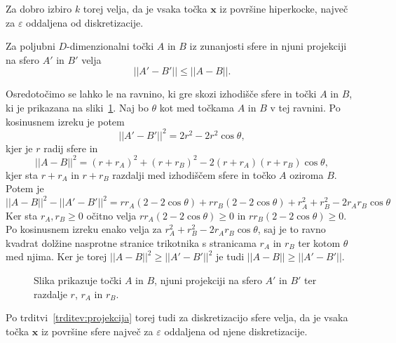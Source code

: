 Za dobro izbiro $k$ torej velja, da je vsaka točka $\textbf{x}$ iz površine hiperkocke, največ za $\varepsilon$ oddaljena od diskretizacije. 
\begin{trditev}
\label{trditev:projekcija}
Za poljubni $D$-dimenzionalni točki $A$ in $B$ iz zunanjosti sfere in njuni projekciji na sfero $A'$ in $B'$ velja
\[
|| A' - B' || \leq || A - B ||. 
\]
\end{trditev}
\begin{dokaz}
Osredotočimo se lahko le na ravnino, ki gre skozi izhodišče sfere in točki $A$ in $B$, ki je prikazana na sliki~\ref{fig:sphere_contraction}. Naj bo $\theta$ kot med točkama $A$ in $B$ v tej ravnini. Po kosinusnem izreku je potem 
\[
||A' - B'||^2 = 2r^2 - 2r^2 \cos \theta,
\]
kjer je $r$ radij sfere in
\[
||A - B||^2 = (r + r_A)^2 + (r + r_B)^2 - 2(r + r_A) (r + r_B) \cos \theta,
\]
kjer sta $r + r_A$ in $r + r_B$ razdalji med izhodiščem sfere in točko $A$ oziroma $B$. Potem je
\[
||A - B||^2 - ||A' - B'||^2 = rr_A (2 - 2 \cos \theta) + rr_B (2 - 2 \cos \theta) + r_A^2 + r_B^2 - 2 r_A r_B \cos \theta
\]
Ker sta $r_A, r_B \geq 0$ očitno velja $rr_A (2 - 2 \cos \theta) \geq 0$ in $rr_B (2 - 2 \cos \theta) \geq 0$. Po kosinusnem izreku enako velja za $r_A^2 + r_B^2 - 2 r_A r_B \cos \theta$, saj je to ravno kvadrat dolžine nasprotne stranice trikotnika s stranicama $r_A$ in $r_B$ ter kotom $\theta$ med njima. Ker je torej $||A - B||^2 \geq ||A' - B'||^2$ je tudi $||A - B|| \geq ||A' - B'||$.
\begin{figure}[ht]
  \centering
  
  \caption{Slika prikazuje točki $A$ in $B$, njuni projekciji na sfero $A'$ in $B'$ ter razdalje $r$, $r_A$ in $r_B$.}
  \label{fig:sphere_contraction}
\end{figure}
\end{dokaz}

Po trditvi~\ref{trditev:projekcija} torej tudi za diskretizacijo sfere velja, da je vsaka točka $\textbf{x}$ iz površine sfere največ za $\varepsilon$ oddaljena od njene diskretizacije. 
